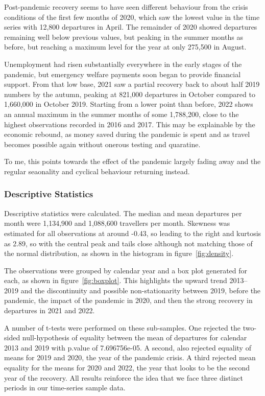 \documentclass[9pt,technote]{IEEEtran}
\begin{document}
Post-pandemic recovery seems to have seen different behaviour from the crisis conditions of the first few months of 2020, which saw the lowest value in the time series with 12,800 departures in April.  The remainder of 2020 showed departures remaining well below previous values, but peaking in the summer months as before, but reaching a maximum level for the year at only 275,500 in August.  

Unemployment had risen substantially everywhere in the early stages of the pandemic, but emergency welfare payments soon began to provide financial support.  From that low base, 2021 saw a partial recovery back to about half 2019 numbers by the autumn, peaking at 821,000 departures in October compared to 1,660,000 in October 2019.  Starting from a lower point than before, 2022 shows an annual maximum in the summer months of some 1,788,200, close to the highest observations recorded in 2016 and 2017.  This may be explainable by the economic rebound, as money saved during the pandemic is spent and as travel becomes possible again without onerous testing and quaratine.  

To me, this points towards the effect of the pandemic largely fading away and the regular seaonality and cyclical behaviour returning instead.  

\subsubsection{Descriptive Statistics}

Descriptive statistics were calculated.  The median and mean departures per month were 1,134,900 and 1,088,600 travellers per month.  Skewness was estimated for all observations at around -0.43, so leading to the right and kurtosis as 2.89, so with the central peak and tails close although not matching those of the normal distribution, as shown in the histogram in figure~\ref{fig:density}.  

The observations were grouped by calendar year and a box plot generated for each, as shown in figure~\ref{fig:boxplot}.  This highlights the upward trend 2013--2019 and the discontinuity and possible non-stationarity between 2019, before the pandemic, the impact of the pandemic in 2020, and then the strong recovery in departures in 2021 and 2022.    

A number of t-tests were performed on these sub-samples.  One rejected the two-sided null-hypothesis of equality between the mean of departures for calendar 2013 and 2019 with p.value of 7.696756e-05. A second, also rejected equality of means for 2019 and 2020, the year of the pandemic crisis.  A third rejected mean equality for the means for 2020 and 2022, the year that looks to be the second year of the recovery.  All results reinforce the idea that we face three distinct periods in our time-series sample data.  
\end{document}
